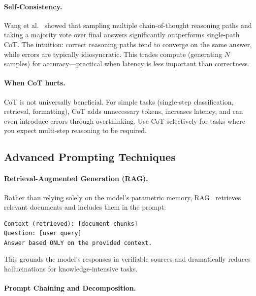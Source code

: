 \paragraph{Self-Consistency.}
\label{self-consistency.}

Wang et al.~\cite{wang2023selfconsistency} showed that sampling multiple chain-of-thought reasoning paths and taking a majority vote over final answers significantly outperforms single-path CoT. The intuition: correct reasoning paths tend to converge on the same answer, while errors are typically idiosyncratic. This trades compute (generating $N$ samples) for accuracy---practical when latency is less important than correctness.

\paragraph{When CoT hurts.}
\label{when-cot-hurts.}

CoT is not universally beneficial. For simple tasks (single-step classification, retrieval, formatting), CoT adds unnecessary tokens, increases latency, and can even introduce errors through overthinking. Use CoT selectively for tasks where you expect multi-step reasoning to be required.

\subsection{Advanced Prompting Techniques}
\label{advanced-prompting-techniques}

\paragraph{Retrieval-Augmented Generation (RAG).}
\label{retrieval-augmented-generation-rag.}

Rather than relying solely on the model’s parametric memory, RAG~\cite{lewis2020retrieval} retrieves relevant documents and includes them in the prompt:

\begin{lstlisting}
Context (retrieved): [document chunks]
Question: [user query]
Answer based ONLY on the provided context.
\end{lstlisting}

This grounds the model’s responses in verifiable sources and dramatically reduces hallucinations for knowledge-intensive tasks.

\paragraph{Prompt Chaining and Decomposition.}
\label{prompt-chaining-and-decomposition.}

